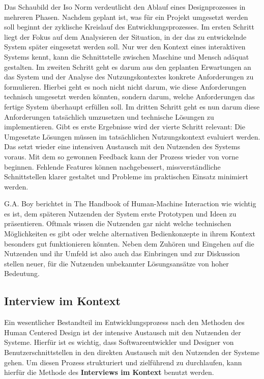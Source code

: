 Das Schaubild der Iso Norm verdeutlicht den Ablauf eines Designprozesses in
mehreren Phasen. Nachdem geplant ist, was für ein Projekt umgesetzt werden soll
beginnt der zyklische Kreislauf des Entwicklungsprozesses. Im ersten Schritt
liegt der Fokus auf dem Analysieren der Situation, in der das zu entwickelnde
System später eingesetzt werden soll. Nur wer den Kontext eines interaktiven
Systems kennt, kann die Schnittstelle zwischen Maschine und Mensch adäquat
gestalten. Im zweiten Schritt geht es darum aus den geplanten Erwartungen an
das System und der Analyse des Nutzungskontextes konkrete Anforderungen zu
formulieren. Hierbei geht es noch nicht nicht darum, wie diese Anforderungen
technisch umgesetzt werden könnten, sondern darum, welche Anforderungen das
fertige System überhaupt erfüllen soll. Im dritten Schritt geht es nun darum
diese Anforderungen tatsächlich umzusetzen und technische Lösungen zu
implementieren. Gibt es erste Ergebnisse wird der vierte Schritt relevant: Die
Umgesetzte Lösungen müssen im tatsächlichen Nutzungskontext evaluiert werden.
Das setzt wieder eine intensiven Austausch mit den Nutzenden des Systems
voraus. Mit dem so gewonnen Feedback kann der Prozess wieder von vorne
beginnen. Fehlende Features können nachgebessert, missverständliche
Schnittstellen klarer gestaltet und Probleme im praktischen Einsatz minimiert
werden.\cite{iso9241}

G.A. Boy berichtet in \glqq{}The Handbook of Human-Machine Interaction\grqq{}
wie wichtig es ist, dem späteren Nutzenden der System erste Prototypen und
Ideen zu präsentieren. Oftmals wissen die Nutzenden gar nicht welche
technischen Möglichkeiten es gibt oder welche alternativen Bedienkonzepte in
ihrem Kontext besonders gut funktionieren könnten. Neben dem Zuhören und
Eingehen auf die Nutzenden und ihr Umfeld ist also auch das Einbringen und zur
Diskussion stellen neuer, für die Nutzenden unbekannter Lösungsansätze von
hoher Bedeutung.\cite{HMI-HCD}

\subsection{Interview im Kontext}

Ein wesentlicher Bestandteil im Entwicklungsprozess nach den Methoden des Human
Centered Design ist der intensive Austausch mit den Nutzenden der Systeme.
Hierfür ist es wichtig, dass Softwareentwickler und Designer von
Benutzerschnittstellen in den direkten Austausch mit den Nutzenden der Systeme
gehen. Um diesen Prozess strukturiert und zielführend zu durchlaufen, kann
hierfür die Methode des \textbf{Interviews im Kontext} benutzt werden.

